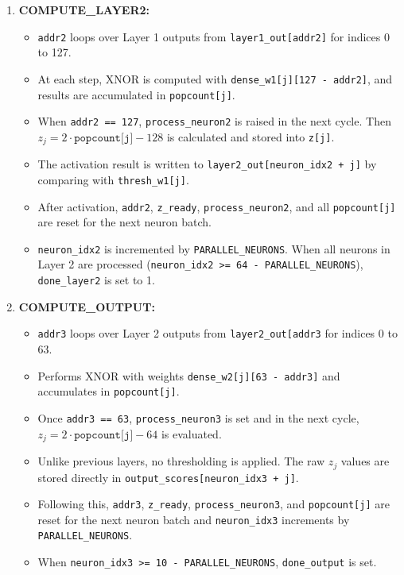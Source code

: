 \documentclass[a4paper,12pt]{report}
\begin{document}
\begin{enumerate}
    \item \textbf{COMPUTE\_LAYER2:}
    \begin{itemize}
        \item \texttt{addr2} loops over Layer 1 outputs from \texttt{layer1\_out[addr2]} for indices 0 to 127.
        \item At each step, XNOR is computed with \texttt{dense\_w1[j][127 - addr2]}, and results are accumulated in \texttt{popcount[j]}.
        \item When \texttt{addr2 == 127}, \texttt{process\_neuron2} is raised in the next cycle. Then \newline $z_j = 2 \cdot \texttt{popcount[j]} - 128$ is calculated and stored into \texttt{z[j]}.
        \item The activation result is written to \texttt{layer2\_out[neuron\_idx2 + j]} by comparing with \texttt{thresh\_w1[j]}.
        \item After activation, \texttt{addr2}, \texttt{z\_ready}, \texttt{process\_neuron2}, and all \texttt{popcount[j]} are reset for the next neuron batch.
        \item \texttt{neuron\_idx2} is incremented by \texttt{PARALLEL\_NEURONS}. When all neurons in Layer 2 are processed (\texttt{neuron\_idx2 >= 64 - PARALLEL\_NEURONS}), \texttt{done\_layer2} is set to 1.
    \end{itemize}
    
    \item \textbf{COMPUTE\_OUTPUT:}
    \begin{itemize}
        \item \texttt{addr3} loops over Layer 2 outputs from \texttt{layer2\_out[addr3} for indices 0 to 63.
        \item Performs XNOR with weights \texttt{dense\_w2[j][63 - addr3]} and accumulates in \texttt{popcount[j]}.
        \item Once \texttt{addr3 == 63}, \texttt{process\_neuron3} is set and in the next cycle, \newline $z_j = 2 \cdot \texttt{popcount[j]} - 64$ is evaluated.
        \item Unlike previous layers, no thresholding is applied. The raw $z_j$ values are stored directly in \texttt{output\_scores[neuron\_idx3 + j]}.
        \item Following this, \texttt{addr3}, \texttt{z\_ready}, \texttt{process\_neuron3}, and \texttt{popcount[j]} are reset for the next neuron batch and \texttt{neuron\_idx3} increments by \texttt{PARALLEL\_NEURONS}.
        \item When \texttt{neuron\_idx3 >= 10 - PARALLEL\_NEURONS}, \texttt{done\_output} is set.
    \end{itemize}


\end{enumerate}
\end{document}
